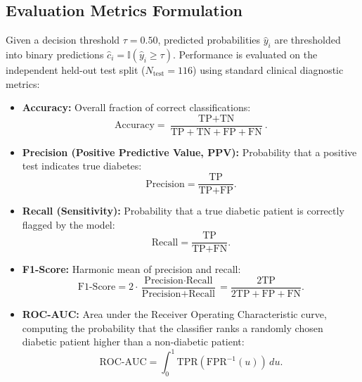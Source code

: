 \documentclass[11pt,a4paper]{article}
\begin{document}
\subsection{Evaluation Metrics Formulation}
Given a decision threshold $\tau = 0.50$, predicted probabilities $\hat{y}_i$ are thresholded into binary predictions $\hat{c}_i = \mathbb{I}(\hat{y}_i \geq \tau)$. Performance is evaluated on the independent held-out test split ($N_{\text{test}}=116$) using standard clinical diagnostic metrics:
\begin{itemize}[leftmargin=*]
    \item \textbf{Accuracy:} Overall fraction of correct classifications:
    \begin{equation}
        \text{Accuracy} = \frac{\text{TP} + \text{TN}}{\text{TP} + \text{TN} + \text{FP} + \text{FN}}.
    \end{equation}
    \item \textbf{Precision (Positive Predictive Value, PPV):} Probability that a positive test indicates true diabetes:
    \begin{equation}
        \text{Precision} = \frac{\text{TP}}{\text{TP} + \text{FP}}.
    \end{equation}
    \item \textbf{Recall (Sensitivity):} Probability that a true diabetic patient is correctly flagged by the model:
    \begin{equation}
        \text{Recall} = \frac{\text{TP}}{\text{TP} + \text{FN}}.
    \end{equation}
    \item \textbf{F1-Score:} Harmonic mean of precision and recall:
    \begin{equation}
        \text{F1-Score} = 2 \cdot \frac{\text{Precision} \cdot \text{Recall}}{\text{Precision} + \text{Recall}} = \frac{2\text{TP}}{2\text{TP} + \text{FP} + \text{FN}}.
    \end{equation}
    \item \textbf{ROC-AUC:} Area under the Receiver Operating Characteristic curve, computing the probability that the classifier ranks a randomly chosen diabetic patient higher than a non-diabetic patient:
    \begin{equation}
        \text{ROC-AUC} = \int_{0}^1 \text{TPR}(\text{FPR}^{-1}(u)) \, du.
    \end{equation}
\end{itemize}
\end{document}
